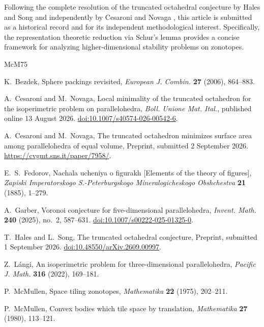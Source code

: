 \documentclass[11pt]{article}
\theoremstyle{remark}
\begin{document}
Following the complete resolution of the truncated octahedral conjecture by Hales and Song \cite{HalesSong2026} and independently by Cesaroni and Novaga \cite{CN26b}, this article is submitted as a historical record and for its independent methodological interest.  Specifically, the representation theoretic reduction via Schur's lemma provides a concise framework for analyzing higher-dimensional stability problems on zonotopes.

\begin{thebibliography}{McM75}
\setlength{\itemsep}{1pt}

K.~Bezdek,
Sphere packings revisited,
\emph{European J. Combin.} \textbf{27} (2006), 864--883.

A.~Cesaroni and M.~Novaga,
Local minimality of the truncated octahedron for the isoperimetric problem on parallelohedra,
\emph{Boll. Unione Mat. Ital.},
published online 13 August 2026.
\href{https://doi.org/10.1007/s40574-026-00542-6}{doi:10.1007/s40574-026-00542-6}.

A.~Cesaroni and M.~Novaga,
The truncated octahedron minimizes surface area among parallelohedra of equal volume,
Preprint, submitted 2 September 2026.
\url{https://cvgmt.sns.it/paper/7958/}.

E.~S.~Fedorov,
Nachala ucheniya o figurakh [Elements of the theory of figures],
\emph{Zapiski Imperatorskogo S.-Peterburgskogo Mineralogicheskogo Obshchestva}
\textbf{21} (1885), 1--279.

A.~Garber,
Voronoi conjecture for five-dimensional parallelohedra,
\emph{Invent. Math.} \textbf{240} (2025), no.~2, 587--631.
\href{https://doi.org/10.1007/s00222-025-01325-0}{doi:10.1007/s00222-025-01325-0}.

T.~Hales and L.~Song,
The truncated octahedral conjecture,
Preprint, submitted 1 September 2026.
\href{https://doi.org/10.48550/arXiv.2609.00997}{doi:10.48550/arXiv.2609.00997}.

Z.~L\'angi,
An isoperimetric problem for three-dimensional parallelohedra,
\emph{Pacific J. Math.} \textbf{316} (2022), 169--181.

P.~McMullen,
Space tiling zonotopes,
\emph{Mathematika} \textbf{22} (1975), 202--211.

P.~McMullen,
Convex bodies which tile space by translation,
\emph{Mathematika} \textbf{27} (1980), 113--121.


\end{thebibliography}
\end{document}
